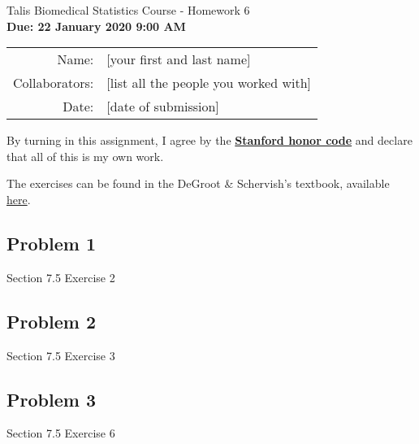 \documentclass[12pt]{article}\usepackage[]{graphicx}\usepackage[]{color}
\begin{document}
\begin{center}
{\Large Talis Biomedical Statistics Course - Homework 6} \\
{\small \textbf{Due: 22 January 2020 9:00 AM}}
\newline

\begin{tabular}{rl}
  Name: & [your first and last name] \\
  Collaborators: & [list all the people you worked with] \\
  Date: & [date of submission]
\end{tabular}
\end{center}

By turning in this assignment, I agree by the \textbf{\href{https://communitystandards.stanford.edu/policies-and-guidance/honor-code}{Stanford honor code}} and declare
that all of this is my own work. \\

\vspace{.2in}

The exercises can be found in the DeGroot \& Schervish's textbook, available
\textcolor{blue}{\href{http://professor.ufabc.edu.br/~nelson.faustino/Ensino/IPE2016/Livros/Morris\%20H\%20DeGroot_\%20Mark\%20J\%20Schervish-Probability\%20and\%20statistics-Pearson\%20Education\%20\%20(2012)\%20(1).pdf}{here}}.


\subsection*{Problem 1}

Section 7.5 Exercise 2 \\


\subsection*{Problem 2}

Section 7.5 Exercise 3 \\


\subsection*{Problem 3}

Section 7.5 Exercise 6 \\


\end{document}
